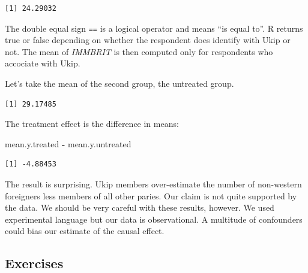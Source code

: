 \documentclass[]{book}
\newenvironment{Shaded}{\begin{snugshade}}{\end{snugshade}}
\newcommand{\KeywordTok}[1]{\textcolor[rgb]{0.13,0.29,0.53}{\textbf{#1}}}
\newcommand{\DecValTok}[1]{\textcolor[rgb]{0.00,0.00,0.81}{#1}}
\newcommand{\StringTok}[1]{\textcolor[rgb]{0.31,0.60,0.02}{#1}}
\newcommand{\OperatorTok}[1]{\textcolor[rgb]{0.81,0.36,0.00}{\textbf{#1}}}
\newcommand{\NormalTok}[1]{#1}
\theoremstyle{definition}
\theoremstyle{definition}
\theoremstyle{definition}
\theoremstyle{remark}
\begin{document}
\begin{verbatim}
[1] 24.29032
\end{verbatim}

The double equal sign \texttt{==} is a logical operator and means ``is
equal to''. R returns true or false depending on whether the respondent
does identify with Ukip or not. The mean of \emph{IMMBRIT} is then
computed only for respondents who accociate with Ukip.

Let's take the mean of the second group, the untreated group.

\begin{Shaded}
\end{Shaded}

\begin{verbatim}
[1] 29.17485
\end{verbatim}

The treatment effect is the difference in means:

\begin{Shaded}
\begin{Highlighting}[]
\NormalTok{mean.y.treated }\OperatorTok{-}\StringTok{ }\NormalTok{mean.y.untreated}
\end{Highlighting}
\end{Shaded}

\begin{verbatim}
[1] -4.88453
\end{verbatim}

The result is surprising. Ukip members over-estimate the number of
non-western foreigners less members of all other paries. Our claim is
not quite supported by the data. We should be very careful with these
results, however. We used experimental language but our data is
observational. A multitude of confounders could bias our estimate of the
causal effect.

\subsection{Exercises}\label{exercises-1}
\end{document}
